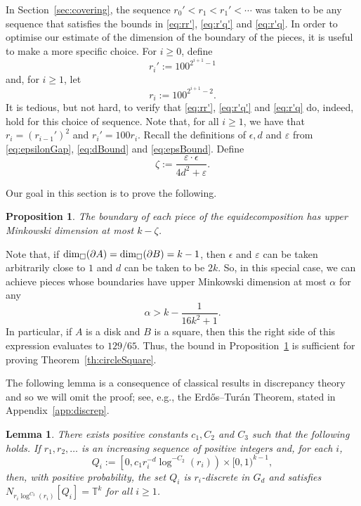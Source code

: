 \documentclass[12pt,a4paper]{amsart}
\numberwithin{equation}{section}
\newtheorem{lemma}[equation]{Lemma}
\newtheorem{proposition}[equation]{Proposition}
\theoremstyle{definition}
\begin{document}
In Section~\ref{sec:covering}, the sequence $r_0'<r_1<r_1'<\cdots$ was taken to be any sequence that satisfies the bounds in \eqref{eq:rr'}, \eqref{eq:r'q'} and \eqref{eq:r'q}. In order to optimise our estimate of the dimension of the boundary of the pieces, it is useful to make a more specific choice. For $i\geq0$, define
\[r_{i}':=100^{2^{i+1} - 1}\]
and, for $i\geq 1$, let
\[r_i:=100^{2^{i+1} - 2}.\]
It is tedious, but not hard, to verify that \eqref{eq:rr'}, \eqref{eq:r'q'} and \eqref{eq:r'q} do, indeed, hold for this choice of sequence. Note that, for all $i\geq1$, we have that $r_i=\left(r_{i-1}'\right)^2$ and $r_i'=100r_i$.  Recall the definitions of $\epsilon,d$ and $\varepsilon$ from \eqref{eq:epsilonGap}, \eqref{eq:dBound} and \eqref{eq:epsBound}. Define
\begin{equation}
\label{eq:zeta}
\zeta:=\frac{\varepsilon\cdot \epsilon}{4d^2+\varepsilon}.
\end{equation}

Our goal in this section is to prove the following.

\begin{proposition}
\label{prop:bdyDim}
The boundary of each piece of the equidecomposition has upper Minkowski dimension at most $k-\zeta$. 
\end{proposition}

Note that, if $\operatorname{dim}_\square(\partial A)=\operatorname{dim}_\square(\partial B)=k-1$, then $\epsilon$ and $\varepsilon$ can be taken arbitrarily close to $1$ and $d$ can be taken to be $2k$. So, in this special case, we can achieve pieces whose boundaries have upper Minkowski dimension at most $\alpha$ for any
\[\alpha > k - \frac{1}{16k^2+1}.\]
In particular, if $A$ is a disk and $B$ is a square, then this the right side of this expression evaluates to $129/65$. Thus, the bound in Proposition~\ref{prop:bdyDim} is sufficient for proving Theorem~\ref{th:circleSquare}. 

The following lemma is a consequence of classical results in discrepancy theory and so we will omit the proof; see, e.g., the Erd\H{o}s--Tur\'{a}n Theorem, stated in Appendix~\ref{app:discrep}.


\begin{lemma}
\label{lem:stripLem}
There exists positive constants $c_1,C_2$ and $C_3$ such that the following holds. If $r_1,r_2,\dots$ is an increasing sequence of positive integers and, for each $i$,  
\[Q_i:=\left[0, c_1r_i^{-d}\log^{-C_2}(r_i)\right)\times [0,1)^{k-1},\]
then, with positive probability, the set $Q_i$ is $r_i$-discrete in $G_d$ and satisfies $N_{r_i\log^{C_3}(r_i)}[Q_{i}]=\mathbb{T}^k$ for all $i\geq1$.
\end{lemma}
\end{document}
